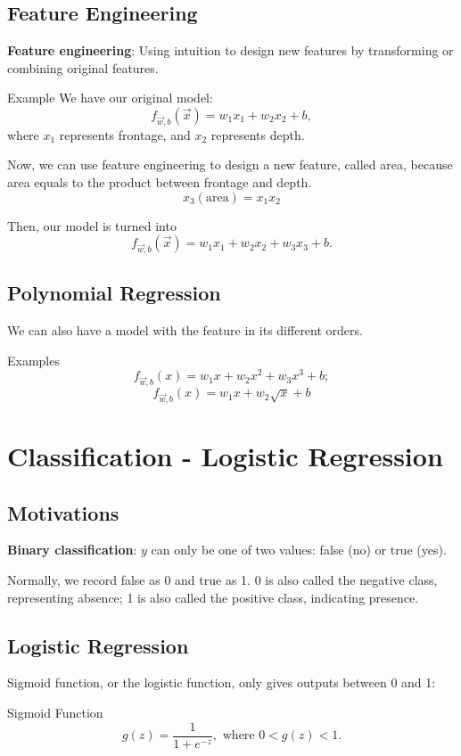 \documentclass[12pt,a4paper]{article}
\begin{document}
\subsection{Feature Engineering}
\quad \textbf{Feature engineering}: Using intuition to design new features by transforming or combining original features.
\begin{egbox}{Example}
	\quad We have our original model: 
	$$f_{\vec{w},b}(\vec{x})=w_1x_1+w_2x_2+b,$$
	where $x_1$ represents frontage, and $x_2$ represents depth. 
	
	\quad Now, we can use feature engineering to design a new feature, called area, because area equals to the product between frontage and depth. 
	$$x_3(\text{area})=x_1x_2$$
	
	\quad Then, our model is turned into $$f_{\vec{w},b}(\vec{x})=w_1x_1+w_2x_2+w_3x_3+b.$$
\end{egbox}


\subsection{Polynomial Regression}
\quad We can also have a model with the feature in its different orders. 
\begin{egbox}{Examples}
	$$f_{\vec{w},b}(x)=w_1x+w_2x^2+w_3x^3+b;$$
	$$f_{\vec{w},b}(x)=w_1x+w_2\sqrt{x}+b$$
\end{egbox}


\section{Classification - Logistic Regression}
\subsection{Motivations}
\quad \textbf{Binary classification}: $y$ can only be one of two values: false (no) or true (yes). 

Normally, we record false as 0 and true as 1. 0 is also called the negative class, representing absence; 1 is also called the positive class, indicating presence.
 
\subsection{Logistic Regression}
\quad Sigmoid function, or the logistic function, only gives outputs between 0 and 1: 
\begin{thmbox}{Sigmoid Function}
	$$g(z)=\frac{1}{1+e^{-z}},\text{ where }0<g(z)<1.$$
\end{thmbox}
\end{document}
